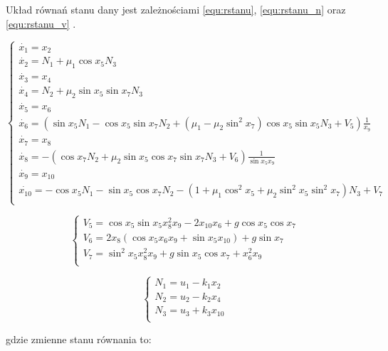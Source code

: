 \documentclass[12pt]{article}
\begin{document}
Układ równań stanu dany jest zależnościami \eqref{equ:rstanu},
\eqref{equ:rstanu_n} oraz \eqref{equ:rstanu_v} \cite{agh:crane}.

\begin{equation}
  \begin{cases}
    \dot{x_1}=x_2\\
    \dot{x_2}=N_1+\mu_1\cos{x_5}N_3\\
    \dot{x_3}=x_4\\
    \dot{x_4}=N_2+\mu_2\sin{x_5}\sin{x_7}N_3\\
    \dot{x_5}=x_6\\
    \dot{x_6}=\left(\sin{x_5}N_1-\cos{x_5}\sin{x_7}N_2+(\mu_1-\mu_2\sin^2{x_7})\cos{x_5}\sin{x_5}N_3+V_5\right)\frac{1}{x_9}\\
    \dot{x_7}=x_8\\
    \dot{x_8}=-\left(\cos{x_7}N_2+\mu_2\sin{x_5}\cos{x_7}\sin{x_7}N_3+V_6\right)\frac{1}{\sin{x_5}x_9}\\
    \dot{x_9}=x_{10}\\
    \dot{x_{10}}=-\cos{x_5}N_1-\sin{x_5}\cos{x_7}N_2-(1+\mu_1\cos^2{x_5}+\mu_2\sin^2{x_5}\sin^2{x_7})N_3+V_7\\
  \end{cases}
  \label{equ:rstanu}
\end{equation}

\begin{equation}
  \begin{cases}
    V_5=\cos{x_5}\sin{x_5}x_8^2x_9-2x_{10}x_6+g\cos{x_5}\cos{x_7}\\
    V_6=2x_8(\cos{x_5}x_6x_9+\sin{x_5}x_{10})+g\sin{x_7}\\
    V_7=\sin^2{x_5}x_8^2x_9+g\sin{x_5}\cos{x_7}+x_6^2x_9\\
  \end{cases}
  \label{equ:rstanu_v}
\end{equation}

\begin{equation}
  \begin{cases}
    N_1=u_1-k_1x_2\\
    N_2=u_2-k_2x_4\\
    N_3=u_3+k_3x_{10}\\
  \end{cases}
  \label{equ:rstanu_n}
\end{equation}

\vspace{0.2cm}
\noindent
gdzie zmienne stanu równania to:
\end{document}
